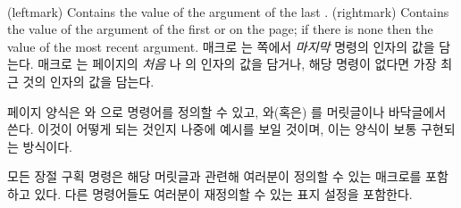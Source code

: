 \begin{plainlist}
\begin{syntax}
\cmd{\leftmark} \cmd{\rightmark} \\
\end{syntax}
\glossary(leftmark)%
  {}%
  {Contains the value of the  argument of the last .}
\glossary(rightmark)%
  {}%
  {Contains the value of the  argument of the first 
   or  on the page; if there is none then the value of the most
   recent  argument.}
매크로 \cmd{\leftmark}는 쪽에서 \emph{마지막} \cmd{\markboth} 명령의
 인자의 값을 담는다.
매크로 \cmd{\rightmark}는 페이지의 \emph{처음} \cmd{\markboth}나
\cmd{\markright}의  인자의 값을 담거나, 해당 명령이 없다면 가장
최근 것의  인자의 값을 담는다.

페이지 양식은 \cmd{\markboth}와 \cmd{\markright}으로  명령어를
정의할 수 있고, \cmd{\leftmark}와(혹은) \cmd{\rightmark}를
머릿글이나 바닥글에서 쓴다.
이것이 어떻게 되는 것인지 나중에 예시를 보일 것이며, 이는 
양식이 보통 구현되는 방식이다.

모든 장절 구획 명령은 해당 머릿글과 관련해 여러분이 정의할 수 있는 매크로를
포함하고 있다.
다른 명령어들도 여러분이 재정의할 수 있는 표지 설정을 포함한다.


\end{plainlist}

